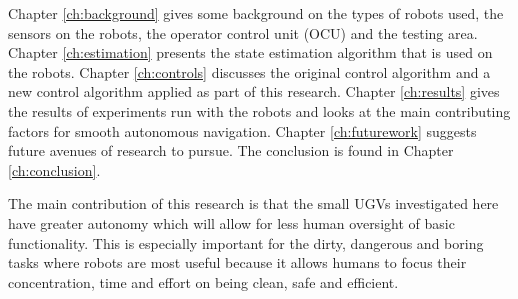 Chapter \ref{ch:background} gives some background on the types of robots used, the sensors on the robots, the operator control unit (OCU) and the testing area. Chapter \ref{ch:estimation} presents the state estimation algorithm that is used on the robots. Chapter \ref{ch:controls} discusses the original control algorithm and a new control algorithm applied as part of this research. Chapter \ref{ch:results} gives the results of experiments run with the robots and looks at the main contributing factors for smooth autonomous navigation. Chapter \ref{ch:futurework} suggests future avenues of research to pursue. The conclusion is found in Chapter \ref{ch:conclusion}.

The main contribution of this research is that the small UGVs investigated here have greater autonomy which will allow for less human oversight of basic functionality. This is especially important for the dirty, dangerous and boring tasks where robots are most useful because it allows humans to focus their concentration, time and effort on being clean, safe and efficient.
